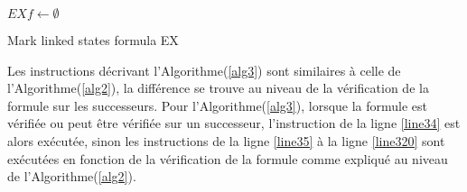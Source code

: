 \begin{algorithm}[H]\label{alg3}
\SetAlgoLined
{}
$EXf \longleftarrow \emptyset$\; \label{line31}
 \caption{Mark linked states formula EX}
\end{algorithm}

Les instructions décrivant l'Algorithme(\ref{alg3}) sont similaires à celle de l'Algorithme(\ref{alg2}), la différence se trouve au niveau de la vérification de la formule sur les successeurs. Pour l'Algorithme(\ref{alg3}), lorsque la formule est vérifiée ou peut être vérifiée sur un successeur, l'instruction de la ligne \ref{line34} est alors exécutée, sinon les instructions de la ligne \ref{line35} à la ligne \ref{line320} sont exécutées en fonction de la vérification de la formule comme expliqué au niveau de  l'Algorithme(\ref{alg2}).

